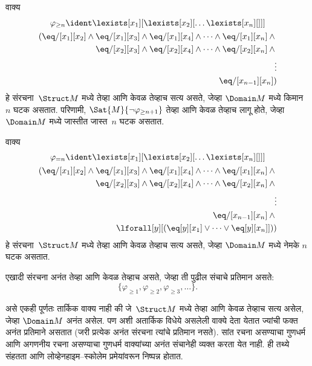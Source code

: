 \begin{prop}
वाक्य
\begin{multline*}
  \varphi_{\ge n} \ident \lexists[x_1][\lexists[x_2][\dots\lexists[x_n][{}]]]\\
  \begin{aligned}
  (\eq/[x_1][x_2] \land {}
  \eq/[x_1][x_3] \land \eq/[x_1][x_4] \land \dots \land \eq/[x_1][x_n] \land {}\\
\eq/[x_2][x_3] \land \eq/[x_2][x_4] \land \dots \land {} \eq/[x_2][x_n] \land {} \\
\vdots\\
\eq/[x_{n-1}][x_n])
\end{aligned}
\end{multline*}
हे संरचना~$\Struct M$ मध्ये तेव्हा आणि केवळ तेव्हाच सत्य असते,
जेव्हा $\Domain M$ मध्ये किमान $n$ घटक असतात. परिणामी,
$\Sat{M}{\lnot \varphi_{\ge n+1}}$ तेव्हा आणि केवळ तेव्हाच लागू होते, जेव्हा
$\Domain M$ मध्ये जास्तीत जास्त~$n$ घटक असतात.

\end{prop}

\begin{prop}
वाक्य
\begin{multline*}
\varphi_{= n} \ident \lexists[x_1][\lexists[x_2][\dots\lexists[x_n][{}]]] \\
\begin{aligned}
  (\eq/[x_1][x_2] \land {}
  \eq/[x_1][x_3] \land \eq/[x_1][x_4] \land \dots \land \eq/[x_1][x_n] \land {}\\
\eq/[x_2][x_3] \land \eq/[x_2][x_4] \land \dots \land {} \eq/[x_2][x_n] \land {} \\
\vdots\\
\eq/[x_{n-1}][x_n] \land {} \\
\lforall[y][(\eq[y][x_1] \lor \dots \lor \eq[y][x_n]]))
\end{aligned}
\end{multline*}
हे संरचना~$\Struct M$ मध्ये तेव्हा आणि केवळ तेव्हाच सत्य असते,
जेव्हा $\Domain M$ मध्ये नेमके $n$ घटक असतात.
\end{prop}

\begin{prop}
एखादी संरचना अनंत तेव्हा आणि केवळ तेव्हाच असते, जेव्हा ती पुढील
संचाचे प्रतिमान असते:
\[\{\varphi_{\ge 1}, \varphi_{\ge 2}, \varphi_{\ge 3}, \dots \}.
\]
\end{prop}

असे एकही पूर्णतः तार्किक वाक्य नाही की जे~$\Struct M$ मध्ये तेव्हा आणि केवळ
तेव्हाच सत्य असेल, जेव्हा $\Domain M$ अनंत असेल. पण अशी अतार्किक
विधेये असलेली वाक्ये देता येतात ज्यांची फक्त अनंत प्रतिमाने
असतात (जरी प्रत्येक अनंत संरचना त्यांचे प्रतिमान नसते). सांत रचना
असण्याचा गुणधर्म आणि अगणनीय रचना असण्याचा गुणधर्म
वाक्यांच्या अनंत संचानेही व्यक्त करता येत नाही. ही तथ्ये संहतता आणि
लोव्हेनहाइम--स्कोलेम प्रमेयांवरून निष्पन्न होतात.



